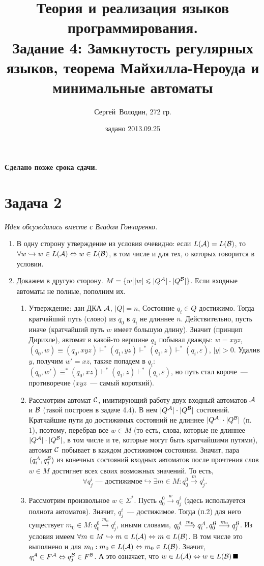\documentclass[a4paper]{article}
\title{Теория и реализация языков программирования.\\Задание 4: Замкнутость регулярных языков, теорема Майхилла-Нероуда и минимальные автоматы}
\date{задано 2013.09.25}
\author{Сергей~Володин, 272 гр.}
\def\A{{\cal A}}
\def\B{{\cal B}}
\def\C{{\cal C}}
\begin{document}
\maketitle
{\bf Сделано позже срока сдачи.}
\section*{Задача 2}
{\em{Идея обсуждалась вместе с Владом Гончаренко.}}
\begin{enumerate}[1.]
\item В одну сторону утверждение из условия очевидно: если $L(\A)=L(\B)$, то $\forall w\hookrightarrow w\in L(\A)\Leftrightarrow w\in L(\B)$, в том числе и для тех, о которых говорится в условии.
\item Докажем в другую сторону. $M=\{w\big ||w|\leqslant |Q^\A|\cdot |Q^\B|\}$. Если входные автоматы не полные, пополним их.
\begin{enumerate}[1.]
\item Утверждение: дан ДКА $\A$, $|Q|=n$, Состояние $q_i\in Q$ достижимо. Тогда кратчайший путь (слово) из $q_0$ в $q_i$ не длиннее $n$. Действительно, пусть иначе (кратчайший путь $w$ имеет большую длину). Значит (принцип Дирихле), автомат в какой-то вершине $q_1$ побывал дважды:  $w=xyz$, $(q_0,w)\equiv(q_0,xyz)\vdash^*(q_1,yz)\vdash^*(q_1,z)\vdash^*(q_i,\varepsilon)$, $|y|>0$. Удалив $y$, получим $w'=xz$, также попадем в $q_i$: $(q_0,w')\equiv^*(q_0,xz)\vdash^*(q_1,z)\vdash^*(q_i,\varepsilon)$, но путь стал короче~--- противоречие ($xyz$~--- самый короткий).
\item Рассмотрим автомат $\C$, имитирующий работу двух входный автоматов $\A$ и $\B$ (такой построен в задаче 4.4). В нем $|Q^\A| \cdot |Q^\B|$ состояний. Кратчайшие пути до достижимых состояний не длиннее $|Q^\A| \cdot |Q^\B|$ (п. 1), поэтому, перебрав все $w\in M$ (то есть, слова, которые не длиннее $|Q^\A| \cdot |Q^\B|$, в том числе и те, которые могут быть кратчайшими путями), автомат $\C$ побывает в каждом достижимом состоянии. Значит, пара $(q^\A_i,q^\B_j)$ из конечных состояний входных автоматов после прочтения слов $w\in M$ достигнет всех своих возможных значений. То есть, $$\forall q^i_j\mbox{~--- достижимое}\hookrightarrow\exists m\in M\colon q^0_0\overset{m}{\longrightarrow}q^i_j.$$
\item Рассмотрим произвольное $w\in\Sigma^*$. Пусть $q^0_0\overset{w}{\longrightarrow}q^i_j$ (здесь используется полнота автоматов). Значит, $q^i_j$~--- достижимое. Тогда (п.2) для него существует $m_0\in M\colon q^0_0\overset{m_0}{\longrightarrow}q^i_j$, иными словами, $q^\A_0\overset{m_0}{\longrightarrow}q^\A_i,q^\B_0\overset{m_0}{\longrightarrow}q^\B_j$.\newline
Из условия имеем $\forall m\in M\hookrightarrow m\in L(\A)\Leftrightarrow m\in L(\B)$. В том числе это выполнено и для $m_0: m_0\in L(\A)\Leftrightarrow m_0\in L(\B)$. Значит, $q^\A_i\in F^\A\Leftrightarrow q^\B_j\in F^\B$. А это означает, что $w\in L(\A)\Leftrightarrow w\in L(\B)\,\blacksquare$
\end{enumerate}
\end{enumerate}
\end{document}
